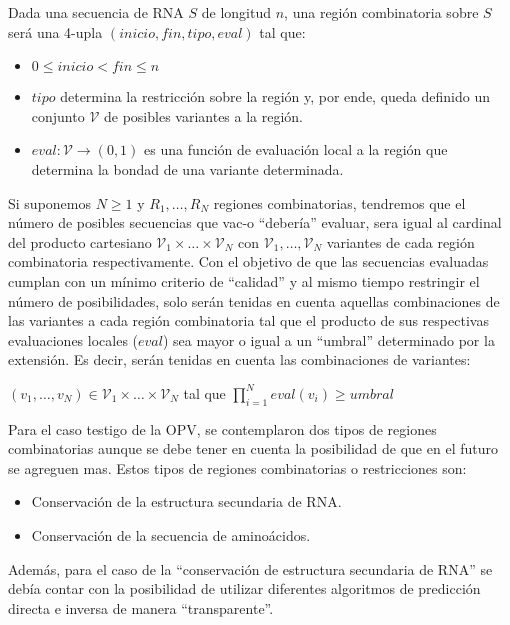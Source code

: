 \begin{definition}
\label{region}
Dada una secuencia de \ac{RNA} $S$ de longitud $n$, una regi\'on combinatoria
sobre $S$ ser\'a una 4-upla $(inicio, fin, tipo, eval)$ tal que:
\begin{itemize}
 \item $0 \le inicio < fin \le n$
 \item $tipo$ determina la restricci\'on sobre la regi\'on y, por ende, queda
definido un conjunto $\mathcal{V}$ de posibles variantes a la regi\'on.
 \item $eval: \mathcal{V} \rightarrow (0,1)$ es una funci\'on de evaluaci\'on
local a la regi\'on que determina la bondad de una variante determinada.
\end{itemize}
\end{definition}

Si suponemos $N \ge 1$ y $R_{1}, \dots, R_{N}$ regiones combinatorias, tendremos
que el n\'umero de posibles secuencias que \ac{vac-o} ``deber\'ia'' evaluar,
sera igual al cardinal del producto cartesiano $\mathcal{V}_{1} \times \dots
\times \mathcal{V}_{N}$ con  $\mathcal{V}_{1}, \dots, \mathcal{V}_{N}$ variantes
de cada regi\'on combinatoria respectivamente. Con el objetivo de que las
secuencias evaluadas cumplan con un m\'inimo criterio de ``calidad'' y al mismo
tiempo restringir el n\'umero de posibilidades, solo ser\'an tenidas en cuenta
aquellas combinaciones de las variantes a cada regi\'on combinatoria tal que el
producto de sus respectivas evaluaciones locales ($eval$) sea mayor o igual a un
``umbral'' determinado por la extensi\'on. Es decir, ser\'an tenidas en cuenta
las combinaciones de variantes:
\begin{center}
$(v_{1},\dots, v_{N}) \in \mathcal{V}_{1} \times \dots \times \mathcal{V}_{N}$
tal que $\prod_{i=1}^{N} eval(v_{i}) \ge umbral$ 
\end{center}

Para el caso testigo de la \ac{OPV}, se contemplaron dos tipos de regiones
combinatorias aunque se debe tener en cuenta la posibilidad de que en el futuro
se agreguen mas. Estos tipos de regiones combinatorias o restricciones son:
\begin{itemize}
 \item Conservaci\'on de la estructura secundaria de \ac{RNA}.
 \item Conservaci\'on de la secuencia de amino\'acidos.
\end{itemize}

Adem\'as, para el caso de la ``conservaci\'on de estructura secundaria de
\ac{RNA}'' se deb\'ia contar con la posibilidad de utilizar diferentes
algoritmos de predicci\'on directa e inversa de manera ``transparente''.

